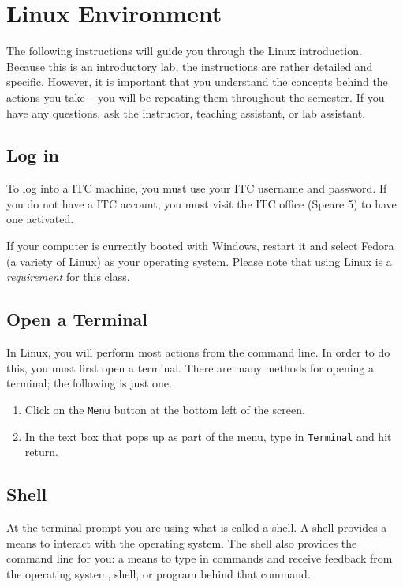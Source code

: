 \documentclass[11pt]{cselabheader}
\begin{document}
\section{Linux Environment}
\label{sec:linux}

The following instructions will guide you through the Linux introduction.
Because this is an introductory lab, the instructions are rather detailed and
specific. However, it is important that you understand the concepts behind the
actions you take -- you will be repeating them throughout the semester. If you
have any questions, ask the instructor, teaching assistant, or lab assistant.

\subsection{Log in}
To log into a ITC machine, you must use your ITC username and password. If you
do not have a ITC account, you must visit the ITC office (Speare 5) to have one
activated.

If your computer is currently booted with Windows, restart it and select Fedora
(a variety of Linux) as your operating system. Please note that using Linux is a
\emph{requirement} for this class.

\subsection{Open a Terminal}
In Linux, you will perform most actions from the command line. In order to do
this, you must first open a terminal. There are many methods for opening a
terminal; the following is just one.

\begin{enumerate}
  \item Click on the \texttt{Menu} button at the bottom left of the screen.
  \item In the text box that pops up as part of the menu, type in
    \texttt{Terminal} and hit return.
\end{enumerate}


\subsection{Shell}
At the terminal prompt you are using what is called a shell. A shell
provides a means to interact with the operating system. The shell also provides
the command line for you: a means to type in commands and receive feedback from
the operating system, shell, or program behind that command.
\end{document}
